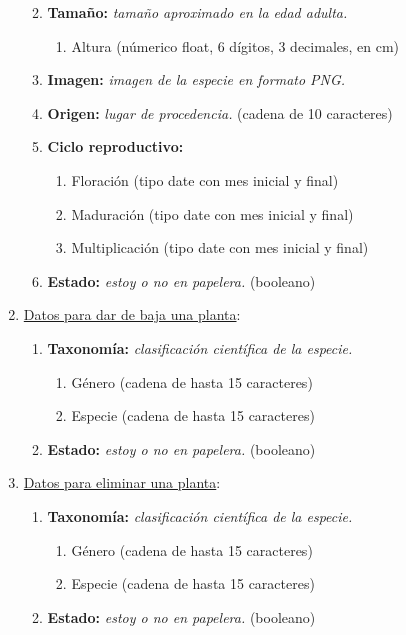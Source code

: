 \documentclass[10pt,a4paper]{article}
\begin{document}
\begin{enumerate}[label={RD\arabic*.} ,leftmargin=2.8\parindent]
\begin{enumerate}[label={RD2.\arabic*.}]
	\medskip
	\item
		\textbf{Tamaño:} \textit{tamaño aproximado en la edad adulta.}
	\begin{enumerate}[label=-]
		\item Altura (númerico float, 6 dígitos, 3 decimales, en cm)
	\end{enumerate}
	
	\medskip	
	\item
		\textbf{Imagen:} \textit{imagen de la especie en formato PNG.}

	\medskip 
	\item
		\textbf{Origen:} \textit{lugar de procedencia.} (cadena de 10 caracteres)
		
	\medskip 
	\item
		\textbf{Ciclo reproductivo:}
	\begin{enumerate} [label=-]
		\item Floración (tipo date con mes inicial y final)
		\item Maduración (tipo date con mes inicial y final)
		\item Multiplicación (tipo date con mes inicial y final)
	\end{enumerate}	
		\medskip 
	\item
		\textbf{Estado:} \textit{estoy o no en papelera.} (booleano)			
	\medskip 
	\medskip
	\end{enumerate}

	\item \underline{Datos para dar de baja una planta}:
	\begin{enumerate}[label={RD3.\arabic*.}]
		\item 
		\textbf{Taxonomía:} \textit{clasificación científica de la especie.}
	\begin{enumerate}[label=-]
		\item Género (cadena de hasta 15 caracteres)
		\item Especie (cadena de hasta 15 caracteres)
	\end{enumerate}
		\medskip 
	\item
		\textbf{Estado:} \textit{estoy o no en papelera.} (booleano)
	\medskip 
	\medskip
	\end{enumerate}
	
	\item \underline{Datos para eliminar una planta}:
	\begin{enumerate}[label={RD4.\arabic*.}]
	
	\item 
		\textbf{Taxonomía:} \textit{clasificación científica de la especie.}
	\begin{enumerate}[label=-]
		\item Género (cadena de hasta 15 caracteres)
		\item Especie (cadena de hasta 15 caracteres)
	\end{enumerate}
	\medskip 
	\item
	\textbf{Estado:} \textit{estoy o no en papelera.} (booleano)
	\medskip 
	\medskip
	\end{enumerate}
	

\end{enumerate}
\end{document}
